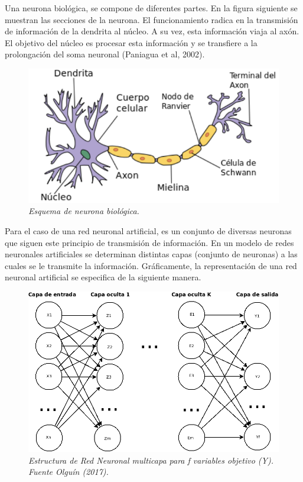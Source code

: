 \documentclass[letterpaper,12pt, spanish, oneside]{book} %
\begin{document}
Una neurona biológica, se compone de diferentes partes. En la figura siguiente se muestran las secciones de la neurona. El funcionamiento radica en la transmisión de información de la dendrita al núcleo. A su vez, esta información viaja al axón. El objetivo del núcleo es procesar esta información y se transfiere a la prolongación del soma neuronal (Paniagua et al, 2002).

\begin{figure}[H]
\centering
\includegraphics[width=1\textwidth]{neurona0.png}
\caption{\label{fig:frog2}\textit{Esquema de neurona biológica.}}
\end{figure}

Para el caso de una red neuronal artificial, es un conjunto de diversas neuronas que siguen este principio de transmisión de información. En un modelo de redes neuronales artificiales se determinan distintas capas (conjunto de neuronas) a las cuales se le transmite la información. Gráficamente, la representación de una red neuronal artificial se especifica de la siguiente manera.

\begin{figure}[H]
\centering
\includegraphics[width=1\textwidth]{neuralnetwork.png}
\caption{\label{fig:frog2}\textit{Estructura de Red Neuronal multicapa para f variables objetivo (Y). Fuente Olguín (2017).}}
\end{figure}
\end{document}
